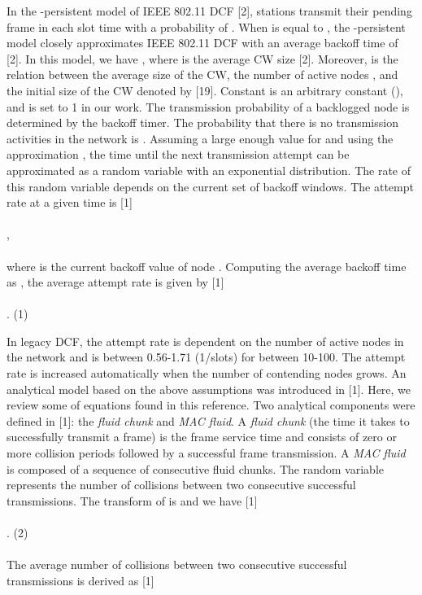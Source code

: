 \documentclass[10pt,twocolumn,oneside,submit]{JCNtran}
\begin{document}
In the -persistent model of IEEE 802.11 DCF [2], stations transmit their pending frame in each slot time with a probability of . When  is equal to , the -persistent model closely approximates IEEE 802.11 DCF with an average backoff time of  [2]. In this model, we have , where  is the average CW size [2]. Moreover,  is the relation between the average size of the CW, the number of active nodes , and the initial size of the CW denoted by  [19]. Constant  is an arbitrary constant (), and is set to 1 in our work. The transmission probability of a backlogged node is determined by the backoff timer. The probability that there is no transmission activities in the network is . Assuming a large enough value for  and using the approximation , the time until the next transmission attempt can be approximated as a random variable with an exponential distribution. The rate of this random variable depends on the current set of backoff windows. The attempt rate at a given time is [1]\\
\\
,\\
\\
where  is the current backoff value of node . Computing the average backoff time as , the average attempt rate  is given by [1]\\
\\
. \hfill(1) \\
\par In legacy DCF, the attempt rate is dependent on the number of active nodes in the network and is between 0.56-1.71 (1/slots) for  between 10-100. The attempt rate is increased automatically when the number of contending nodes grows. An analytical model based on the above assumptions was introduced in [1]. Here, we review some of equations found in this reference. Two analytical components were defined in [1]: the {\it fluid chunk} and {\it MAC fluid}. A {\it fluid chunk} (the time it takes to successfully transmit a frame) is the frame service time and consists of zero or more collision periods followed by a successful frame transmission. A {\it MAC fluid} is composed of a sequence of consecutive fluid chunks. The random variable  represents the number of collisions between two consecutive successful transmissions. The  transform of  is  and we have [1]\\
\\
. \hfill(2) \\
\\
The average number of collisions between two consecutive successful transmissions  is derived as [1]\\
\end{document}
